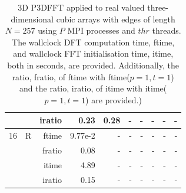 \documentclass[a4paper]{article}
\begin{document}
\begin{table}[htbp]
\begin{center}
\begin{small}
\begin{tabular}{|r|r|r|r|r|r|r|r|r|r|}
             &             &  iratio &    0.23 &    0.28 &      - &      - &      - &      - &      - \\\hline
   16 &  R &   ftime &   9.77e-2 &      - &      - &      - &      - &      - &      - \\
             &             &  fratio &    0.08 &     - &      - &      - &      - &      - &      - \\
             &             &  itime &    4.89  &      - &      - &      - &      - &      - &      - \\
             &             &  iratio &    0.15 &      - &      - &      - &      - &      - &      - \\\hline

\end{tabular}
\caption{3D P3DFFT applied to real valued three-dimensional cubic arrays with edges of length $N=257$ using $P$ MPI processes and $thr$ threads. The wallclock DFT computation time, ftime, and wallclock FFT initialisation time, itime, both in seconds, are provided. Additionally, the ratio, fratio, of ftime  with ftime($p=1,t=1$) and the ratio, iratio, of itime  with itime($p=1,t=1$) are provided.) }\label{Tbl:P3DFFT3d257}
\end{small}
\end{center}
\end{table}
\end{document}
